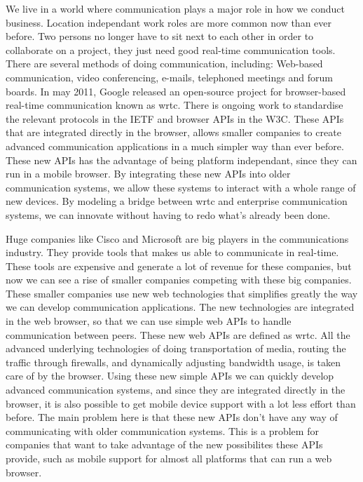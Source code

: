 We live in a world where communication plays a major role in how we conduct business. Location independant work roles are more common now than ever before. Two persons no longer have to sit next to each other in order to collaborate on a project, they just need good real-time communication tools. There are several methods of doing communication, including: Web-based communication, video conferencing, e-mails, telephoned meetings and forum boards. In may 2011, Google released an open-source project for browser-based real-time communication known as \gls{wrtc}\cite{google-release-of-webrtc}. There is ongoing work to standardise the relevant protocols in the IETF\cite{ietf} and browser APIs in the W3C\cite{w3c}. These APIs that are integrated directly in the browser, allows smaller companies to create advanced communication applications in a much simpler way than ever before. These new APIs has the advantage of being platform independant, since they can run in a mobile browser. By integrating these new APIs into older communication systems, we allow these systems to interact with a whole range of new devices. By modeling a bridge between \gls{wrtc} and enterprise communication systems, we can innovate without having to redo what's already been done.

Huge companies like Cisco and Microsoft are big players in the communications industry. They provide tools that makes us able to communicate in real-time. These tools are expensive and generate a lot of revenue for these companies, but now we can see a rise of smaller companies competing with these big companies. These smaller companies use new web technologies that simplifies greatly the way we can develop communication applications. The new technologies are integrated in the web browser, so that we can use simple web APIs to handle communication between peers. These new web APIs are defined as \gls{wrtc}. All the advanced underlying technologies of doing transportation of media, routing the traffic through firewalls, and dynamically adjusting bandwidth usage, is taken care of by the browser. Using these new simple APIs we can quickly develop advanced communication systems, and since they are integrated directly in the browser, it is also possible to get mobile device support with a lot less effort than before. The main problem here is that these new APIs don't have any way of communicating with older communication systems. This is a problem for companies that want to take advantage of the new possibilites these APIs provide, such as mobile support for almost all platforms that can run a web browser.

